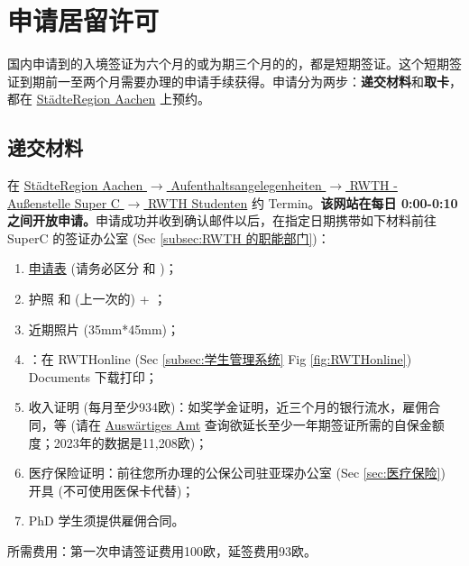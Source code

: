 \section{申请居留许可}\label{sec:申请居留许可}

  国内申请到的入境签证为六个月的或为期三个月的的，都是短期签证。这个短期签证到期前一至两个月需要办理的申请手续获得。申请分为两步：\textbf{递交材料}和\textbf{取卡}，都在 \href{https://termine.staedteregion-aachen.de/auslaenderamt/}{StädteRegion Aachen} 上预约。

  \subsection{递交材料}\label{subsec:递交材料}

    在 \href{https://termine.staedteregion-aachen.de/auslaenderamt/}{StädteRegion Aachen $\rightarrow$ Aufenthaltsangelegenheiten $\rightarrow$  RWTH - Außenstelle Super C $\rightarrow$ RWTH Studenten} 约 Termin。\textbf{该网站在每日 0:00-0:10 之间开放申请。}申请成功并收到确认邮件以后，在指定日期携带如下材料前往 SuperC 的签证办公室 (Sec \ref{subsec:RWTH 的职能部门})：
    \begin{enumerate}
      \item \href{https://bportal.staedteregion-aachen.de/staedteregion-a-z/-/egov-bis-detail/dienstleistung/15000/show}{申请表} (请务必区分 和 )；
      \item 护照 和 (上一次的)  + ；
      \item 近期照片 (35mm*45mm)；
      \item {}：在 RWTHonline (Sec \ref{subsec:学生管理系统} Fig \ref{fig:RWTHonline}) Documents 下载打印；
      \item 收入证明 (每月至少934欧)：如奖学金证明，近三个月的银行流水，雇佣合同，等 (请在 \href{https://www.auswaertiges-amt.de/de/sperrkonto/375488}{Auswärtiges Amt} 查询欲延长至少一年期签证所需的自保金额度；2023年的数据是11,208欧)；
      \item 医疗保险证明：前往您所办理的公保公司驻亚琛办公室 (Sec \ref{sec:医疗保险}) 开具 (不可使用医保卡代替)；
      \item PhD 学生须提供雇佣合同。
    \end{enumerate}
    所需费用：第一次申请签证费用100欧，延签费用93欧。

